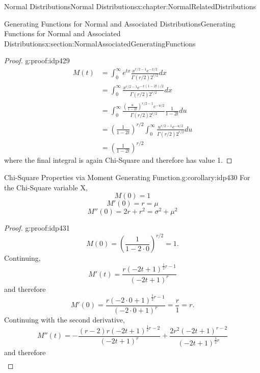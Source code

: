 \documentclass[oneside,10pt,]{book}
\numberwithin{equation}{section}
\begin{document}
\begin{chapterptx}{Normal Distributions}{}{Normal Distributions}{}{}{x:chapter:NormalRelatedDistributions}
\begin{sectionptx}{Generating Functions for Normal and Associated Distributions}{}{Generating Functions for Normal and Associated Distributions}{}{}{x:section:NormalAssociatedGeneratingFunctions}
\begin{proof}{}{g:proof:idp429}
\begin{align*}
M(t) & = \int_0^{\infty} e^{tx} \frac{x^{r/2-1} e^{-x/2} }{\Gamma(r/2) 2^{r/2} } dx\\
& = \int_0^{\infty} \frac{x^{r/2-1} e^{-x(1-2 t)/2} }{\Gamma(r/2) 2^{r/2}} dx\\
& = \int_0^{\infty} \frac{\left ( \frac{u}{1-2t} \right )^{r/2-1} e^{-u/2} }{\Gamma(r/2) 2^{r/2} } \frac{1}{1-2t} du\\
& = \left ( \frac{1}{1-2t} \right )^{r/2} \int_0^{\infty} \frac{u^{r/2-1} e^{-u/2} }{\Gamma(r/2) 2^{r/2}} du\\
& = \left ( \frac{1}{1-2t} \right )^{r/2}
\end{align*}
where the final integral is again Chi-Square and therefore has value 1.%
\end{proof}
 \begin{corollary}{Chi-Square Properties via Moment Generating Function.}{}{g:corollary:idp430}%
For the Chi-Square variable X,%
\begin{equation*}
M(0) = 1
\end{equation*}
%
\begin{equation*}
M'(0) = r = \mu
\end{equation*}
%
\begin{equation*}
M''(0) = 2r + r^2 = \sigma^2 + \mu^2
\end{equation*}
%
\end{corollary}
\begin{proof}{}{g:proof:idp431}
%
\begin{equation*}
M(0) = \left ( \frac{1}{1-2 \cdot 0} \right )^{r/2} = 1.
\end{equation*}
Continuing,%
\begin{equation*}
M'(t) = \frac{r {\left(-2 t + 1\right)}^{\frac{1}{2} r - 1}}{{\left(-2 t + 1 \right)}^{r}}
\end{equation*}
and therefore%
\begin{equation*}
M'(0) = \frac{r {\left(-2 \cdot 0 + 1\right)}^{\frac{1}{2} r - 1}}{{\left(-2 \cdot 0 + 1 \right)}^{r}} = \frac{r}{1} = r.
\end{equation*}
Continuing with the second derivative,%
\begin{equation*}
M''(t) = -\frac{{\left(r - 2\right)} r {\left(-2 t + 1\right)}^{\frac{1}{2} r - 2}}{{\left(-2 t + 1\right)}^{r}} + \frac{2 r^{2} {\left(-2 t + 1\right)}^{r - 2}}{{\left(-2 t + 1\right)}^{\frac{3}{2} r}}
\end{equation*}
and therefore%
\begin{align*}

\end{align*}
\end{proof}
\end{sectionptx}
\end{chapterptx}
\end{document}

